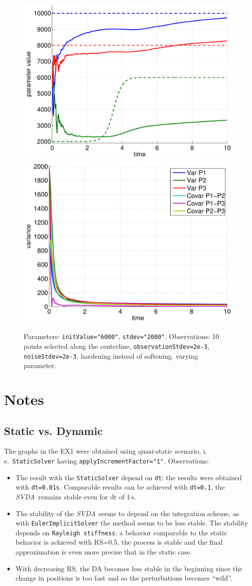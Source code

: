\documentclass[10pt]{article}
\def\ie{i.\,e.}
\def\svda{\textit{SVDA}}
\begin{document}
\begin{figure}[h]
\begin{center}
\includegraphics[width=.49\linewidth]{figures/pHardSmooth3_estim.pdf}
\hfill
\includegraphics[width=.49\linewidth]{figures/pHardSmooth3_var.pdf}
\caption{Parameters: \texttt{initValue="6000"}, \texttt{stdev="2000"}. Observations: 10 points selected along the centerline,
\texttt{observationStdev=2e-3}, \texttt{noiseStdev=2e-3}, hardening instead of softening.
varying parameter.}
\label{fig:Results1}
\end{center}
\end{figure}



\section{Notes}

\subsection{Static vs. Dynamic}
The graphs in the EX1 were obtained using quasi-static scenario, \ie\ \texttt{StaticSolver} having \texttt{applyIncrementFactor="1"}. Observations:
\begin{itemize}
 \item The result with the \texttt{StaticSolver} depend on \texttt{dt}: the results were obtained with \texttt{dt=0.01s}. Comparable results can be
achieved with \texttt{dt=0.1}, 
 the \svda\ remains stable even for dt of 1\,s.
 \item The stability of the \svda\ seems to depend on the integration scheme, as with \texttt{EulerImplicitSolver} the method seems to be less stable.
The stability depends on \texttt{Rayleigh stiffness}: a behavior comparable to the static behavior is achieved with RS=0.5, the process is stable and
the final approximation is even more precise that in the static case. 
\item With decreasing RS, the DA becomes less stable in the beginning since the change in positions is too fast and so the perturbations becomes
``wild''. 
\end{itemize}
\end{document}
